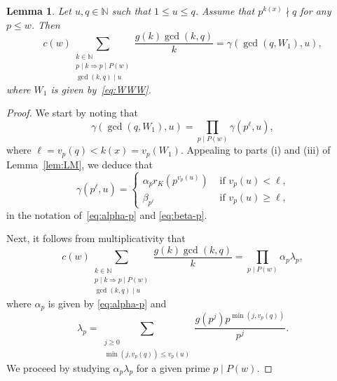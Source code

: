 \documentclass[11pt,letterpaper]{amsart}
\renewcommand{\leq}{\leqslant}
\renewcommand{\geq}{\geqslant}
\newtheorem{lemma}[theorem]{Lemma}
\theoremstyle{definition}
\numberwithin{equation}{section}
\newcommand\NN{\mathbb{N}}
\newcommand{\0}{\mathbf{0}}
\begin{document}
\begin{lemma}\label{lem:5.5}
Let $u,q\in \NN$ such that $1\leq u\leq q$. 
Assume that $p^{k(x)}\nmid q$
for any $p\leq w$.
Then 
$$
c(w)
\sum_{\substack{k\in \NN\\ 
p\mid k \Rightarrow p\mid P(w)
\\ \gcd(k,q)\mid u}} \frac{g(k)\gcd(k,
q) }{k}
= 
\gamma(\gcd(q,W_1),u),
$$
where  $W_1$ is given by~\eqref{eq:WWW}.
\end{lemma}

\begin{proof}
We start by noting that 
$$
\gamma(\gcd(q,W_1),u)=\prod_{p\mid P(w)} \gamma(p^{\ell},u),
$$
where $\ell=v_p(q)<k(x)=v_p(W_1)$.
Appealing to parts (i) and (iii) of Lemma~\ref{lem:LM}, we deduce that 
\begin{equation}\label{eq:HHH}
\gamma(p^{\ell},u)=\begin{cases}
\alpha_p r_K(p^{v_p(u)}) & \text{ if $v_p(u)<\ell$,}\\
\beta_{p^\ell}
& 
\text{ if $v_p(u)\geq \ell$,}
\end{cases}
\end{equation}
in the notation of~\eqref{eq:alpha-p} and 
\eqref{eq:beta-p}.

Next, 
it follows from multiplicativity that 
$$
c(w)
\sum_{\substack{k\in \NN\\ 
p\mid k \Rightarrow p\mid P(w)
\\ \gcd(k,q)\mid u}} \frac{g(k)\gcd(k,q) }{k}
= 
\prod_{p\mid P(w)} \alpha_p \lambda_p,
$$
where $\alpha_p$ is given by 
\eqref{eq:alpha-p} and
$$
\lambda_p=
\sum_{
\substack{ j\geq 0\\
\min(j,v_p(q))\leq v_p(u)
}}\frac{g(p^j)
p^{\min(j,v_p(q))}
}{p^j}.
$$
We proceed by studying $\alpha_p\lambda_p$ for a given prime $p\mid P(w)$.



\end{proof}
\end{document}
